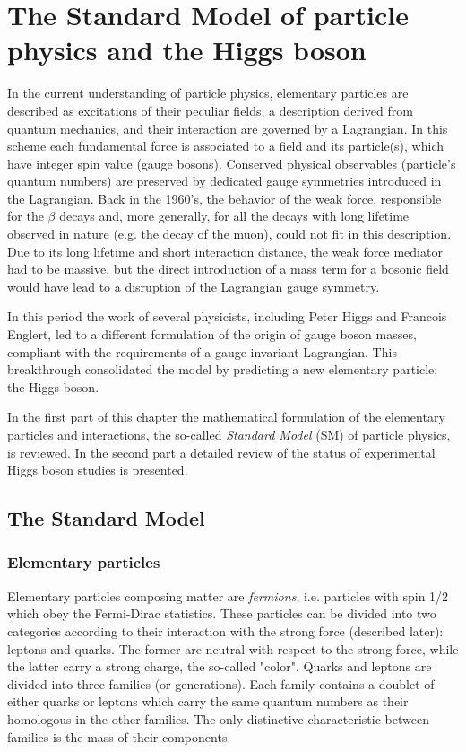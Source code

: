 \chapter[The Higgs boson]{The Standard Model of particle physics and the Higgs boson}

In the current understanding of particle physics, elementary particles are described as excitations of their peculiar fields, a description derived from quantum mechanics, and their interaction are governed by a Lagrangian. In this scheme each fundamental force is associated to a field and its particle(s), which have integer spin value (gauge bosons). 
Conserved physical observables (particle's quantum numbers) are preserved by dedicated gauge symmetries introduced in the Lagrangian. Back in the 1960's, the behavior of the weak force, responsible for the $\beta$ decays and, more generally, for all the decays with long lifetime observed in nature (e.g. the decay of the muon), could not fit in this description. Due to its long lifetime and short interaction distance, the weak force mediator had to be massive, but the direct introduction of a mass term for a bosonic field would have lead to a disruption of the Lagrangian gauge symmetry. 

In this period the work of several physicists, including Peter Higgs and Francois Englert, led to a different formulation of the origin of gauge boson masses, compliant with the requirements of a gauge-invariant Lagrangian. This breakthrough consolidated the model by predicting a new elementary particle: the Higgs boson.

In the first part of this chapter the mathematical formulation of the elementary particles and interactions, the so-called \emph{Standard Model} (SM) of particle physics, is reviewed. In the second part a detailed review of the status of experimental Higgs boson studies is presented.

\section{The Standard Model}
\subsection{Elementary particles}

Elementary particles composing matter are \emph{fermions}, i.e. particles with spin 1/2 which obey the Fermi-Dirac statistics. These particles can be divided into two categories according to their interaction with the strong force (described later): leptons and quarks. The former are neutral with respect to the strong force, while the latter carry a strong charge, the so-called "color". Quarks and leptons are divided into three families (or generations). Each family contains a doublet of either quarks or leptons which carry the same quantum numbers as their homologous in the other families. The only distinctive characteristic between families is the mass of their components.

